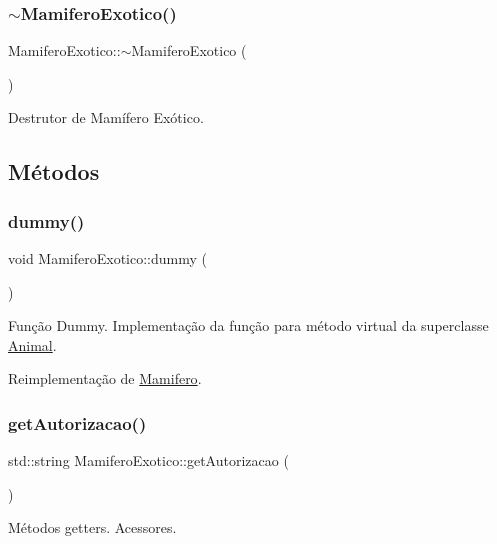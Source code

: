 \subsubsection{\texorpdfstring{$\sim$\+Mamifero\+Exotico()}{~MamiferoExotico()}}
{\footnotesize\ttfamily Mamifero\+Exotico\+::$\sim$\+Mamifero\+Exotico (\begin{DoxyParamCaption}{ }\end{DoxyParamCaption})}

Destrutor de Mamífero Exótico. 

\subsection{Métodos}
\mbox{\label{classMamiferoExotico_a0198a13cb62c2400c3a1e9e8a3ddc792}} 
\subsubsection{\texorpdfstring{dummy()}{dummy()}}
{\footnotesize\ttfamily void Mamifero\+Exotico\+::dummy (\begin{DoxyParamCaption}{ }\end{DoxyParamCaption})\hspace{0.3cm}{\ttfamily [virtual]}}

Função Dummy. Implementação da função para método virtual da superclasse \hyperlink{classAnimal}{Animal}. 

Reimplementação de \hyperlink{classMamifero_a8f2a488b1796d3ccf0ff9e1c5a82af05}{Mamifero}.

\mbox{\label{classMamiferoExotico_adfb4f012bfe20e861c86d18305ff79e4}} 
\subsubsection{\texorpdfstring{get\+Autorizacao()}{getAutorizacao()}}
{\footnotesize\ttfamily std\+::string Mamifero\+Exotico\+::get\+Autorizacao (\begin{DoxyParamCaption}{ }\end{DoxyParamCaption})}

Métodos getters. Acessores. \mbox{\label{classMamiferoExotico_a8d6e213728fc09f524885350212dffa8}} 
